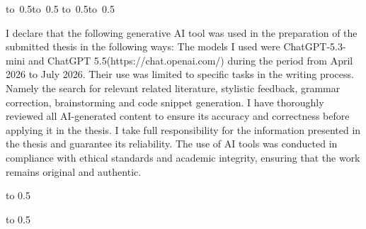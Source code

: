 \vspace{10mm}

\hbox{\hbox to 0.5\hbox to 0.5\hsize{\dotfill\quad}}
\smallskip
\hbox{\hbox to 0.5\hsize{}\hbox to 0.5}

\vspace{20mm}
\newpage
I declare that the following generative AI tool was used in the
preparation of the submitted thesis in the following ways:
The models I used were ChatGPT-5.3-mini and ChatGPT 5.5(https://chat.openai.com/)
during the period from April 2026 to July 2026. 
Their use was limited to
specific tasks in the writing process. Namely the search for relevant related literature, stylistic  feedback, grammar correction, brainstorming and code snippet generation.
I have thoroughly reviewed all AI-generated content to ensure its accuracy and
correctness before applying it in the thesis. I take full responsibility for the information
presented in the thesis and guarantee its reliability. The use of AI tools was
conducted in compliance with ethical standards and academic integrity, ensuring
that the work remains original and authentic.
\newpage

\openright

\noindent
\Dedication
\newpage


\openright

\vbox to 0.5
\newpage


\openright

\vbox to 0.5

\newpage

\openright
\pagestyle{plain}
\setcounter{page}{1}

